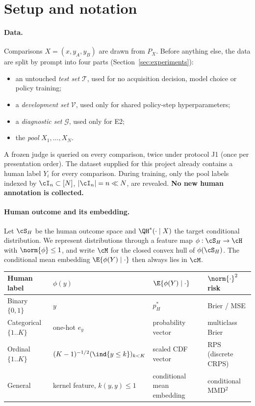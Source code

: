 \section{Setup and notation}
\label{sec:setup}

\paragraph{Data.}
Comparisons $X=(x,y_A,y_B)$ are drawn from $P_X$. Before anything else, the data are split by
prompt into four parts (Section~\ref{sec:experiments}):
\begin{itemize}
  \item an untouched \emph{test set} $\mathcal T$, used for no acquisition decision, model choice or
        policy training;
  \item a \emph{development set} $\mathcal V$, used only for shared policy-step hyperparameters;
  \item a \emph{diagnostic set} $\mathcal G$, used only for E2;
  \item the \emph{pool} $X_1,\dots,X_N$.
\end{itemize}
A frozen judge is queried on every comparison, twice under protocol J1 (once per presentation
order). The dataset supplied for this project already contains a
human label $Y_i$ for every comparison. During training, only the pool labels indexed by
$\cI_n\subset[N]$, $|\cI_n|=n\ll N$, are revealed. \textbf{No new human annotation is collected.}

\paragraph{Human outcome and its embedding.}
Let $\cS_H$ be the human outcome space and $\QH^{*}(\cdot\mid X)$ the target conditional distribution.
We represent distributions through a feature map $\phi:\cS_H\to\cH$ with $\norm{\phi}\le1$, and write
$\cM$ for the closed convex hull of $\phi(\cS_H)$. The conditional mean embedding
$\E\{\phi(Y)\mid\cdot\}$ then always lies in $\cM$.

\begin{center}
\small
\renewcommand{\arraystretch}{1.15}
\begin{tabular}{@{}llll@{}}
\toprule
Human label & $\phi(y)$ & $\E\{\phi(Y)\mid\cdot\}$ & $\norm{\cdot}^2$ risk \\
\midrule
Binary $\{0,1\}$ & $y$ & $p_H^{*}$ & Brier / MSE \\
Categorical $\{1..K\}$ & one-hot $e_y$ & probability vector & multiclass Brier \\
Ordinal $\{1..K\}$ & $(K-1)^{-1/2}(\ind\{y\le k\})_{k<K}$ & scaled CDF vector & RPS (discrete CRPS) \\
General & kernel feature, $k(y,y)\le1$ & conditional mean embedding & conditional MMD$^2$ \\
\bottomrule
\end{tabular}
\end{center}


